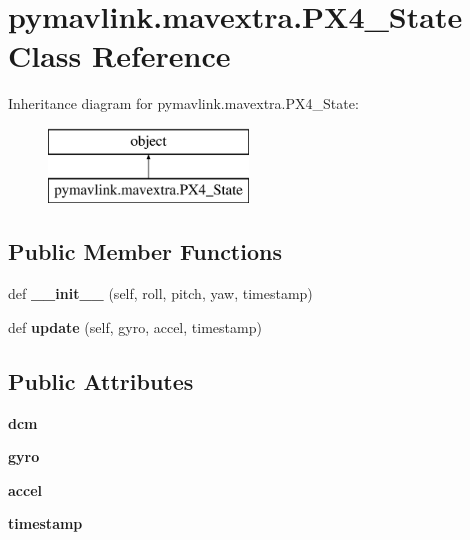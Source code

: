 \hypertarget{classpymavlink_1_1mavextra_1_1PX4__State}{}\section{pymavlink.\+mavextra.\+P\+X4\+\_\+\+State Class Reference}
\label{classpymavlink_1_1mavextra_1_1PX4__State}
Inheritance diagram for pymavlink.\+mavextra.\+P\+X4\+\_\+\+State\+:\begin{figure}[H]
\begin{center}
\leavevmode
\includegraphics[height=2.000000cm]{classpymavlink_1_1mavextra_1_1PX4__State}
\end{center}
\end{figure}
\subsection*{Public Member Functions}
\begin{DoxyCompactItemize}
\item 
\mbox{\label{classpymavlink_1_1mavextra_1_1PX4__State_a18f7e046f1a106b2174974649f8ec4da}} 
def {\bfseries \+\_\+\+\_\+init\+\_\+\+\_\+} (self, roll, pitch, yaw, timestamp)
\item 
\mbox{\label{classpymavlink_1_1mavextra_1_1PX4__State_a037948aa501815589cc75599fed81b34}} 
def {\bfseries update} (self, gyro, accel, timestamp)
\end{DoxyCompactItemize}
\subsection*{Public Attributes}
\begin{DoxyCompactItemize}
\item 
\mbox{\label{classpymavlink_1_1mavextra_1_1PX4__State_a434595eca65107e404a6debec708e3a6}} 
{\bfseries dcm}
\item 
\mbox{\label{classpymavlink_1_1mavextra_1_1PX4__State_a4ef07e653fe7a41779192a631ce2f8f8}} 
{\bfseries gyro}
\item 
\mbox{\label{classpymavlink_1_1mavextra_1_1PX4__State_a886dcbf09202e4d1a8ea8d8034b7a4de}} 
{\bfseries accel}
\item 
\mbox{\label{classpymavlink_1_1mavextra_1_1PX4__State_a6197e3a9dd12b294c85a5362cec42484}} 
{\bfseries timestamp}
\end{DoxyCompactItemize}


